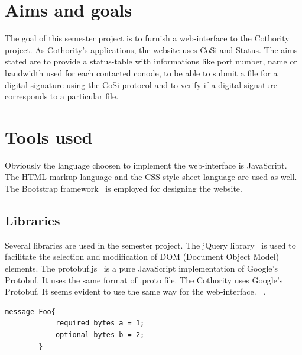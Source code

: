 \documentclass[11pt, a4paper, twoside, openright, openany]{article}
\begin{document}
\section{Aims and goals}
The goal of this semester project is to furnish a web-interface to the Cothority project.
As Cothority's applications, the website uses CoSi and Status.
\newline
The aims stated are to provide a status-table with informations like port number,
name or bandwidth used for each contacted conode, to be able to submit a file for
a digital signature using the CoSi protocol and to verify if a digital signature
corresponds to a particular file.
\bigbreak

\section{Tools used}
Obviously the language choosen to implement the web-interface is JavaScript.
The HTML markup language and the CSS style sheet language are used as well.
\newline
The Bootstrap framework~\cite{bootstrap} is employed for designing the website.
\break

\subsection{Libraries}
Several libraries are used in the semester project.
\newline
The jQuery library~\cite{query} is used to
facilitate the selection and modification of DOM (Document Object Model) elements.
\newline \newline
The protobuf.js~\cite{protobufjs} is a pure JavaScript implementation of Google's Protobuf.
It uses the same format of .proto file.
The Cothority uses Google's Protobuf.
It seems evident to use the same way for the web-interface.
\newline
{}~\cite{protobufDefi}.
\bigbreak

\begin{lstlisting}[caption={Example of .proto file}, captionpos=b]
 message Foo{
            required bytes a = 1;
            optional bytes b = 2;
        }
\end{lstlisting}
\end{document}
